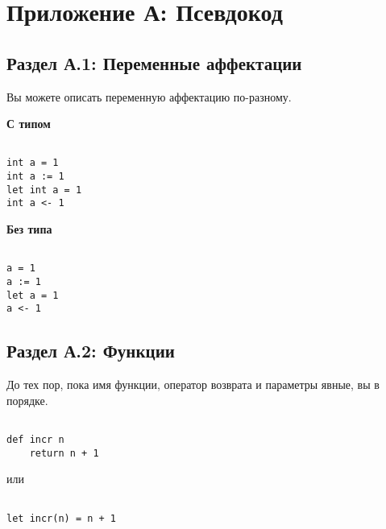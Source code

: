 \chapter*{Приложение А: Псевдокод}
\section*{Раздел А.1: Переменные аффектации}
Вы можете описать переменную аффектацию по-разному.

\vspace{\baselineskip}
\textbf{С типом}

\begin{tcolorbox}
\begin{verbatim}

int a = 1 
int a := 1 
let int a = 1
int a <- 1

\end{verbatim}
\end{tcolorbox}

\vspace{\baselineskip}
\textbf{Без типа}

\begin{tcolorbox}
\begin{verbatim}

a = 1 
a := 1
let a = 1 
a <- 1 

\end{verbatim}
\end{tcolorbox}

\section*{Раздел А.2: Функции}
До тех пор, пока имя функции, оператор возврата и параметры явные, вы в порядке.

\vspace{\baselineskip}
\begin{tcolorbox}
\begin{verbatim}

def incr n    
	return n + 1

\end{verbatim}
\end{tcolorbox}

\vspace{\baselineskip}
или

\vspace{\baselineskip}
\begin{tcolorbox}
\begin{verbatim}

let incr(n) = n + 1

\end{verbatim}
\end{tcolorbox}

